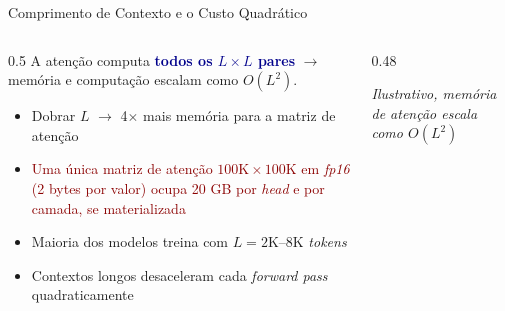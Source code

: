 \documentclass[aspectratio=169, xcolor=dvipsnames]{beamer}
\begin{document}
  \begin{frame}{Comprimento de Contexto e o Custo Quadrático}
    \begin{columns}
      \begin{column}{0.5\textwidth}
        A atenção computa \textcolor{DarkBlue}{\textbf{todos os $L \times L$ pares}} $\to$ memória e computação escalam como $O(L^2)$.

        \begin{itemize}
          \item Dobrar $L$ $\to$ 4$\times$ mais memória para a matriz de atenção
          \item \textcolor{DarkRed}{Uma única matriz de atenção $100\text{K} \times 100\text{K}$ em \textit{fp16} (2 bytes por valor) ocupa 20 GB por \textit{head} e por camada, se materializada}
          \item Maioria dos modelos treina com $L = \text{2K--8K}$ \textit{tokens}
          \item Contextos longos desaceleram cada \textit{forward pass} quadraticamente
        \end{itemize}
      \end{column}
      \begin{column}{0.48\textwidth}
        {\scriptsize\textit{Ilustrativo, memória de atenção escala como $O(L^2)$}}
      \end{column}
    \end{columns}
  \end{frame}
\end{document}
